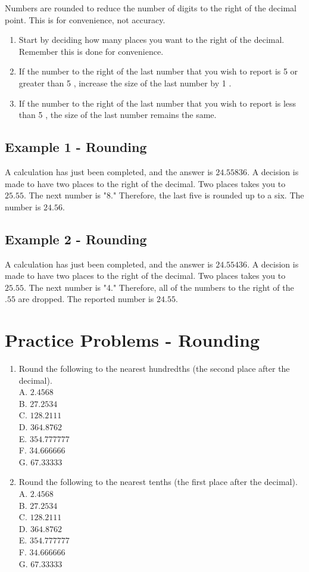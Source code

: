 Numbers are rounded to reduce the number of digits to the right of the decimal point. This is for convenience, not accuracy.

\begin{enumerate}
  \item Start by deciding how many places you want to the right of the decimal. Remember this is done for convenience.

  \item If the number to the right of the last number that you wish to report is 5 or greater than 5 , increase the size of the last number by 1 .

  \item If the number to the right of the last number that you wish to report is less than 5 , the size of the last number remains the same.

\end{enumerate}
\subsection{Example 1 - Rounding}
A calculation has just been completed, and the answer is $24.55836$. A decision is made to have two places to the right of the decimal. Two places takes you to $25.55$. The next number is "8." Therefore, the last five is rounded up to a six. The number is $24.56$.

\subsection{Example 2 - Rounding}
A calculation has just been completed, and the answer is $24.55436$. A decision is made to have two places to the right of the decimal. Two places takes you to $25.55$. The next number is "4." Therefore, all of the numbers to the right of the $.55$ are dropped. The reported number is $24.55$.

\section{Practice Problems - Rounding}
\begin{enumerate}
  \item Round the following to the nearest hundredths (the second place after the decimal).\\
A. $2.4568$\\
B. $27.2534$\\
C. $128.2111$\\
D. $364.8762$\\
E. $354.777777$\\
F. $34.666666$\\
G. $67.33333$

  \item Round the following to the nearest tenths (the first place after the decimal).\\
A. $2.4568$\\
B. $27.2534$\\
C. $128.2111$\\
D. $364.8762$\\
E. $354.777777$\\
F. $34.666666$\\
G. $67.33333$

\end{enumerate}
